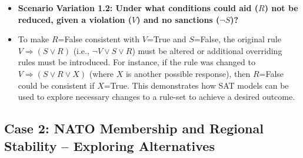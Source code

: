 \documentclass[11pt, a4paper]{article}
\begin{document}
\begin{itemize}
    \item \textbf{Scenario Variation 1.2: Under what conditions could aid ($R$) not be reduced, given a violation ($V$) and no sanctions ($\neg S$)?}
        \item To make $R$=False consistent with $V$=True and $S$=False, the original rule $V \Rightarrow (S \vee R)$ (i.e., $\neg V \vee S \vee R$) must be altered or additional overriding rules must be introduced. For instance, if the rule was changed to $V \Rightarrow (S \vee R \vee X)$ (where $X$ is another possible response), then $R$=False could be consistent if $X$=True. This demonstrates how SAT models can be used to explore necessary changes to a rule-set to achieve a desired outcome.
\end{itemize}

\subsection*{Case 2: NATO Membership and Regional Stability – Exploring Alternatives}
\end{document}
